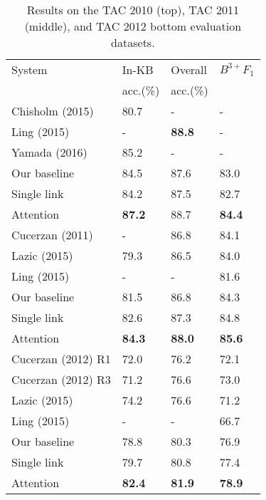 \begin{table}[t!]
\centering
\begin{tabular}{l|l|l|l}
 System & In-KB & Overall & {\small ${B^{3+}F_1}$} \\ 
 & acc.(\%) & acc.(\%) & \\
\hline
\hline
Chisholm (2015) & 80.7& - & - \\
Ling (2015) & - & {\bf 88.8} & - \\
Yamada (2016)&  85.2 & - & - \\
  Our baseline & 84.5 & 87.6 & 83.0 \\
 Single link & 84.2 & 87.5 & 82.7\\
 Attention & {\bf 87.2} & {88.7} & {\bf 84.4} \\
\hline \hline
Cucerzan (2011) & - & 86.8 &  84.1 \\
Lazic (2015) & 79.3 & 86.5 & 84.0 \\
Ling (2015) &- & - & 81.6 \\
Our baseline & 81.5 & 86.8 & 84.3 \\
Single link & 82.6 & 87.3 & 84.8 \\
 Attention & {\bf 84.3} & {\bf 88.0} & {\bf 85.6} \\
\hline
\hline
Cucerzan (2012) R1 & 72.0 & 76.2 & 72.1  \\
Cucerzan (2012) R3 & 71.2 & 76.6 & 73.0 \\
Lazic (2015) & {74.2} & {76.6} & 71.2 \\
Ling (2015) & - & - & 66.7 \\
Our baseline &78.8 & 80.3 & 76.9\\
 Single link & 79.7 & {80.8} & {77.4}  \\
 Attention &{\bf 82.4} & {\bf 81.9} & {\bf 78.9} \\ \hline
\end{tabular}
\caption{Results on the TAC 2010 (top), TAC 2011 (middle), and TAC 2012 bottom evaluation datasets. \label{table:tac_results} }
\end{table}

